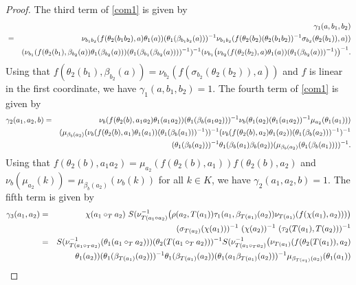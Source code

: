\documentclass[11pt]{amsart}
\theoremstyle{thrm}
\theoremstyle{plain}
\theoremstyle{definition}
\numberwithin{equation}{section}
\begin{document}
\begin{proof}
	The third term of \eqref{com1} is given by
	\begin{eqnarray}\label{t1}
		&& \gamma_1(a, b_1, b_2) \notag\\
		&=&	  \nu_{b_1 b_2}(f(\theta_2(b_1 b_2), a)\theta_1(a))(\theta_1(\beta_{b_1 b_2}(a)))^{-1} \nu_{b_1 b_2}(f( \theta_2(b_2)(\theta_2(b_1 b_2))^{-1}\sigma_{b_2}(\theta_2(b_1)), a))\notag \\ 
		&&(\nu_{b_1}(f(\theta_2(b_1), \beta_{b_2}(a))\theta_1(\beta_{b_2}(a)))(\theta_1(\beta_{b_1}(\beta_{b_2}(a))))^{-1})^{-1}(\nu_{b_1}\big( \nu_{b_2}(f(\theta_2(b_2), a)\theta_1(a))(\theta_1(\beta_{b_2}(a)))^{-1})\big)^{-1}. \notag
	\end{eqnarray}
Using that $f(\theta_2(b_1), \beta_{b_2}(a))= \nu_{b_2}(f(\sigma_{b_2}(\theta_2(b_2)),a))$ and $f$ is linear in the first coordinate, we have $\gamma_1(a, b_1, b_2)=1$. The fourth term of \eqref{com1} is given by
	\begin{eqnarray}
		\gamma_2(a_1, a_2,b) &= & \nu_b(f(\theta_2(b), a_1a_2)\theta_1(a_1 a_2))(\theta_1(\beta_b(a_1 a_2)))^{-1} \nu_{b}(\theta_1(a_2)(\theta_1(a_1 a_2))^{-1}\mu_{a_2}(\theta_1(a_1))) \notag\\
		&&  (\mu_{ \beta_{b}(a_2)}(\nu_b(f(\theta_2(b), a_1)\theta_1(a_1))(\theta_1(\beta_b(a_1)))^{-1}))^{-1} (\nu_b(f(\theta_2(b), a_2)\theta_1(a_2)) (\theta_1(\beta_b(a_2)))^{-1})^{-1}\notag\\
		&&(\theta_1(\beta_{b}(a_2)))^{-1}\theta_1(\beta_{b}(a_1)\beta_{b}(a_2))(\mu_{\beta_{b}(a_2)}(\theta_1(\beta_{b}(a_1))))^{-1}.\notag
	\end{eqnarray}
	Using that $f(\theta_2(b), a_1 a_2) =  \mu_{ a_2}(f(\theta_2(b),a_1))f(\theta_2(b), a_2)$ and $\nu_b(\mu_{ a_2}(k))=\mu_{ \beta_{b}(a_2)}(\nu_b(k))$ for all $k \in K$, we have $\gamma_2(a_1, a_2,b)=1$. The fifth term is given by 
	\begin{eqnarray*}
		\gamma_3(a_1, a_2) &= & \chi(a_1 \circ_T a_2) ~S(\nu^{-1}_{T(a_1 \circ a_2)}\big(\rho(a_2, T(a_1))\tau_1(a_1,\beta_{T(a_1)}(a_2)) \nu_{T(a_1)}(f(\chi(a_1), a_2)))\big)\notag\\
		&& (\sigma_{T(a_2)}( \chi(a_1)))^{-1} ~(\chi(a_2))^{-1} ~(\tau_2(T(a_1), T(a_2) ))^{-1} \notag\\
		&= &  S(\nu^{-1}_{T(a_1 \circ_T a_2)}(\theta_1(a_1 \circ_T a_2))) (\theta_2(T(a_1 \circ_T a_2)))^{-1} S(\nu^{-1}_{T(a_1 \circ_T a_2)}\big( \nu_{T(a_1)}(f(\theta_2(T(a_1)), a_2)\notag\\
		&& \theta_1(a_2))(\theta_1(\beta_{T(a_1)}(a_2)))^{-1} \theta_1(\beta_{T(a_1)}(a_2))(\theta_1(a_1 \beta_{T(a_1)}(a_2)))^{-1}\mu_{\beta_{T(a_1)}(a_2)}(\theta_1(a_1))\notag\\

\end{eqnarray*}
\end{proof}
\end{document}
